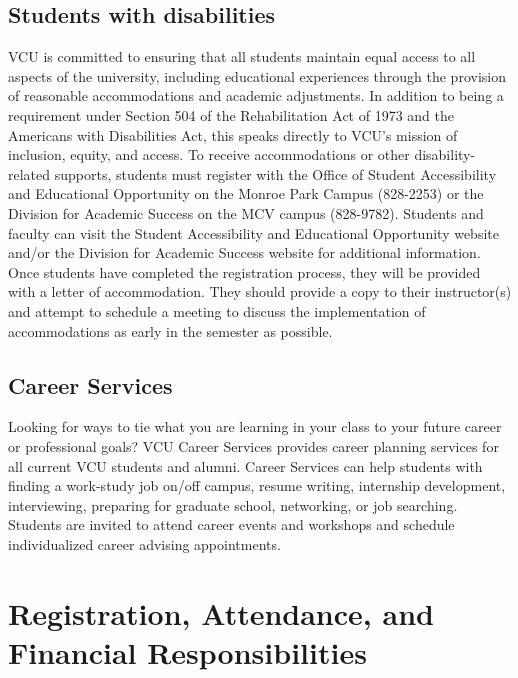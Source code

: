 \documentclass[
  letterpaper,
]{book}
\begin{document}
\subsection*{Students with
disabilities}\label{students-with-disabilities}

VCU is committed to ensuring that all students maintain equal access to
all aspects of the university, including educational experiences through
the provision of reasonable accommodations and academic adjustments. In
addition to being a requirement under Section 504 of the Rehabilitation
Act of 1973 and the Americans with Disabilities Act, this speaks
directly to VCU's mission of inclusion, equity, and access. To receive
accommodations or other disability-related supports, students must
register with the Office of Student Accessibility and Educational
Opportunity on the Monroe Park Campus (828-2253) or the Division for
Academic Success on the MCV campus (828-9782). Students and faculty can
visit the Student Accessibility and Educational Opportunity website
and/or the Division for Academic Success website for additional
information. Once students have completed the registration process, they
will be provided with a letter of accommodation. They should provide a
copy to their instructor(s) and attempt to schedule a meeting to discuss
the implementation of accommodations as early in the semester as
possible.

\subsection*{Career Services}\label{career-services}

Looking for ways to tie what you are learning in your class to your
future career or professional goals? VCU Career Services provides career
planning services for all current VCU students and alumni. Career
Services can help students with finding a work-study job on/off campus,
resume writing, internship development, interviewing, preparing for
graduate school, networking, or job searching. Students are invited to
attend career events and workshops and schedule individualized career
advising appointments.

\section*{Registration, Attendance, and Financial
Responsibilities}\label{registration-attendance-and-financial-responsibilities}
\end{document}
